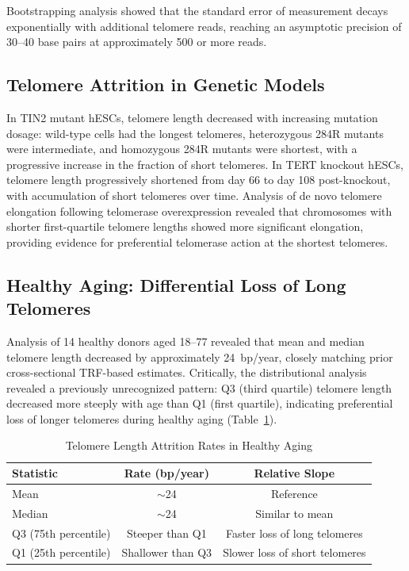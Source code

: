 \documentclass[11pt]{article}
\begin{document}
Bootstrapping analysis showed that the standard error of measurement decays exponentially with additional telomere reads, reaching an asymptotic precision of 30--40 base pairs at approximately 500 or more reads.

\subsection{Telomere Attrition in Genetic Models}

In TIN2 mutant hESCs, telomere length decreased with increasing mutation dosage: wild-type cells had the longest telomeres, heterozygous 284R mutants were intermediate, and homozygous 284R mutants were shortest, with a progressive increase in the fraction of short telomeres. In TERT knockout hESCs, telomere length progressively shortened from day 66 to day 108 post-knockout, with accumulation of short telomeres over time. Analysis of de novo telomere elongation following telomerase overexpression revealed that chromosomes with shorter first-quartile telomere lengths showed more significant elongation, providing evidence for preferential telomerase action at the shortest telomeres.

\subsection{Healthy Aging: Differential Loss of Long Telomeres}

Analysis of 14 healthy donors aged 18--77 revealed that mean and median telomere length decreased by approximately 24~bp/year, closely matching prior cross-sectional TRF-based estimates. Critically, the distributional analysis revealed a previously unrecognized pattern: Q3 (third quartile) telomere length decreased more steeply with age than Q1 (first quartile), indicating preferential loss of longer telomeres during healthy aging (Table~\ref{tab:aging}).

\begin{table}[ht]
\centering
\caption{Telomere Length Attrition Rates in Healthy Aging}
\label{tab:aging}
\begin{tabular}{lcc}
\toprule
\textbf{Statistic} & \textbf{Rate (bp/year)} & \textbf{Relative Slope} \\
\midrule
Mean & $\sim$24 & Reference \\
Median & $\sim$24 & Similar to mean \\
Q3 (75th percentile) & Steeper than Q1 & Faster loss of long telomeres \\
Q1 (25th percentile) & Shallower than Q3 & Slower loss of short telomeres \\
\bottomrule
\end{tabular}
\end{table}
\end{document}
